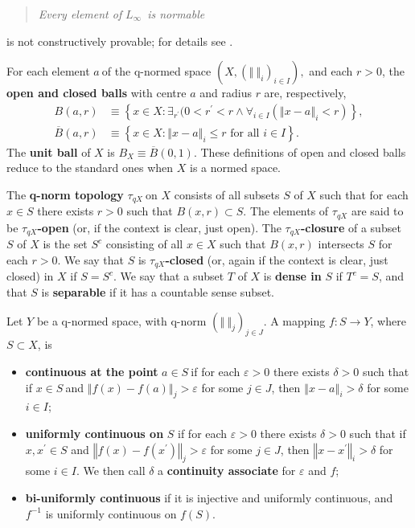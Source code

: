 \documentclass[11pt]{article}%
\begin{document}
\begin{quote}
\emph{Every element of }$L_{\infty}$\emph{\ is normable}
\end{quote}

%

\noindent
is not constructively provable; for details see \cite[pages 346--350]{BB}.

For each element $a\ $of the q-normed space $\left(  X,\left(  \left\Vert
\ \right\Vert _{i}\right)  _{i\in I}\right)  ,$ and each $r>0$, the
\textbf{open and closed balls} with centre $a$ and radius $r$ are,
respectively,%
\begin{align*}
B(a,r)  &  \equiv\left\{  x\in X:\exists_{r^{\prime}}(0<r^{\prime}%
<r\wedge\forall_{i\in I}(\left\Vert x-a\right\Vert _{i}<r)\right\}  ,\\
\overline{B}(a,r)  &  \equiv\left\{  x\in X:\left\Vert x-a\right\Vert _{i}\leq
r\text{ for all }i\in I\right\}  .
\end{align*}
The \textbf{unit ball} of $X$ is $B_{X}\equiv\overline{B}(0,1)$. These
definitions of open and closed balls reduce to the standard ones when $X$ is a
normed space.

The \textbf{q-norm topology} $\tau_{qX}\ $on $X$ consists of all subsets $S$
of $X$ such that for each $x\in S$ there exists $r>0$ such that $B(x,r)\subset
S$. The elements of $\tau_{qX}$ are said to be $\tau_{qX}$\textbf{-open} (or,
if the context is clear, just open). The $\tau_{qX}$\textbf{-closure} of a
subset $S$ of $X$ is the set $S^{c}$ consisting of all $x\in X$ such that
$B(x,r)$ intersects $S$ for each $r>0$. We say that $S $ is $\tau_{qX}%
$\textbf{-closed} (or, again if the context is clear, just closed) in $X$ if
$S=S^{c}$. We say that a subset $T$ of $X$ is \textbf{dense in }$S$ if
$T^{c}=S$, and that $S$ is \textbf{separable }if it has a countable sense subset.

Let $Y$ be a q-normed space, with q-norm $(\left\Vert \ \right\Vert
_{j})_{j\in J}$. A mapping $f:S\rightarrow Y$, where $S\subset X$, is

\begin{itemize}
\item \textbf{continuous at the point} $a\in S\ $if for each $\varepsilon>0$
there exists $\delta>0$ such that if $x\in S\ $and $\left\Vert
f(x)-f(a)\right\Vert _{j}>\varepsilon$ for some $j\in J$, then $\left\Vert
x-a\right\Vert _{i}>\delta$ for some $i\in I$;

\item \textbf{uniformly continuous on }$S$ if for each $\varepsilon>0$ there
exists $\delta>0$ such that if $x,x^{\prime}\in S$ and $\left\Vert
f(x)-f(x^{\prime})\right\Vert _{j}>\varepsilon$ for some $j\in J$, then
$\left\Vert x-x^{\prime}\right\Vert _{i}>\delta$ for some $i\in I$. We then
call $\delta$ a \textbf{continuity associate} for $\varepsilon$ and $f$;

\item \textbf{bi-uniformly continuous} if it is injective and uniformly
continuous, and $f^{-1}$ is uniformly continuous on $f(S)$.
\end{itemize}
\end{document}
